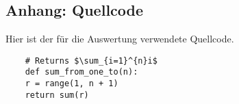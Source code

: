\begin{appendix}


\chapter{Anhang: Quellcode}

Hier ist der für die Auswertung verwendete Quellcode.

\begin{verbatim}
    # Returns $\sum_{i=1}^{n}i$
    def sum_from_one_to(n):
    r = range(1, n + 1)
    return sum(r)
\end{verbatim}


\end{appendix}
